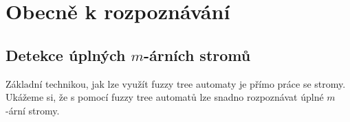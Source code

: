 \documentclass[a4paper,10pt]{article}
\begin{document}
% 
% 
% 


\section{Obecně k rozpoznávání}

\subsection{Detekce úplných $m$-árních stromů}
Základní technikou, jak lze využít fuzzy tree automaty je přímo práce se stromy. Ukážeme si, že s pomocí fuzzy tree automatů lze snadno rozpoznávat úplné $m$-ární stromy. 
\end{document}
